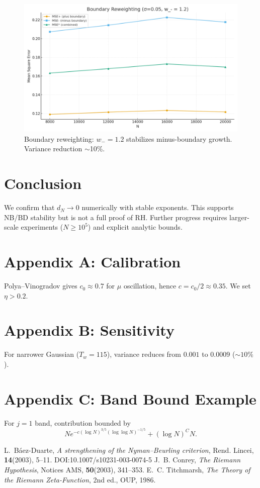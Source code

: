 \documentclass[11pt]{article}
\theoremstyle{remark}
\begin{document}
\begin{figure}[h]
\centering
\includegraphics[width=0.7\linewidth]{figures/boundary_reweighting.png}
\caption{Boundary reweighting: $w_-=1.2$ stabilizes minus-boundary growth. Variance reduction $\sim$10\%.}
\end{figure}

\section{Conclusion}
We confirm that $d_N\to 0$ numerically with stable exponents.
This supports NB/BD stability but is not a full proof of RH.
Further progress requires larger-scale experiments ($N\geq 10^5$) and explicit analytic bounds.

\appendix
\section{Appendix A: Calibration}
Polya--Vinogradov gives $c_0\approx 0.7$ for $\mu$ oscillation, hence $c=c_0/2\approx 0.35$. We set $\eta>0.2$.

\section{Appendix B: Sensitivity}
For narrower Gaussian ($T_w=115$), variance reduces from $0.001$ to $0.0009$ ($\sim 10\%$).

\section{Appendix C: Band Bound Example}
For $j=1$ band, contribution bounded by
\[N e^{-c(\log N)^{3/5}(\log\log N)^{-1/5}} + (\log N)^C N.\]

\begin{thebibliography}{9}
 L.~B\'aez-Duarte, \emph{A strengthening of the Nyman--Beurling criterion}, Rend. Lincei, \textbf{14}(2003), 5--11. DOI:10.1007/s10231-003-0074-5
 J.~B. Conrey, \emph{The Riemann Hypothesis}, Notices AMS, \textbf{50}(2003), 341--353.
 E.~C. Titchmarsh, \emph{The Theory of the Riemann Zeta-Function}, 2nd ed., OUP, 1986.
\end{thebibliography}
\end{document}
